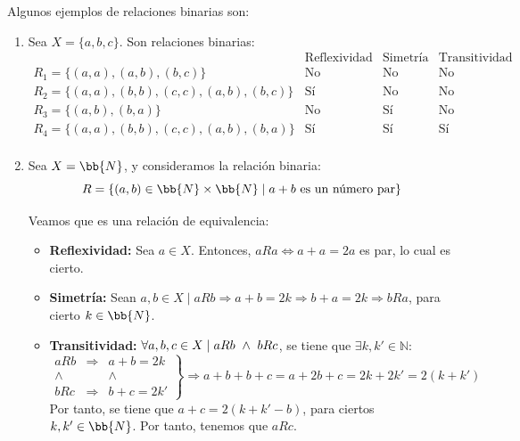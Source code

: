 \begin{ejemplo} Algunos ejemplos de relaciones binarias son:
\begin{enumerate}
    \item Sea $X=\{a,b,c\}$. Son relaciones binarias:
    \begin{equation*}
        \begin{array}{l|ccc}
            & \text{Reflexividad} & \text{Simetría} & \text{Transitividad} \\ \hline
            R_1 = \{(a,a), (a,b), (b,c)\} & \text{No} & \text{No} & \text{No} \\
            R_2 = \{(a,a), (b,b), (c,c), (a,b), (b,c)\} & \text{Sí} & \text{No} & \text{No} \\
            R_3 = \{(a,b), (b,a)\} & \text{No} & \text{Sí} & \text{No} \\
            R_4 = \{(a,a), (b,b), (c,c), (a,b), (b,a)\} & \text{Sí} & \text{Sí} & \text{Sí} \\
        \end{array}
    \end{equation*}

    \item Sea $X=\bb{N}$, y consideramos la relación binaria:
    \begin{equation*}
        R=\{(a,b)\in \bb{N}\times \bb{N} \mid a+b \text{ es un número par}\}
    \end{equation*}

    Veamos que es una relación de equivalencia:
    \begin{itemize}
        \item \textbf{Reflexividad:}  Sea $a\in X$. Entonces, $aRa \Longleftrightarrow a+a=2a$ es par, lo cual es cierto.
        \item \textbf{Simetría:} Sean $a,b \in X \mid aRb\Longrightarrow a+b=2k \Longrightarrow b+a=2k \Longrightarrow bRa$, para cierto $k\in \bb{N}$.
        \item \textbf{Transitividad:} $\forall a,b,c \in X \mid aRb \ \land \  bRc$, se tiene que $\exists k,k'\in \mathbb{N}$:
        \begin{equation*}
            \left.\begin{array}{ccc}
                aRb & \Longrightarrow & a+b=2k \\
                \land&&\land\\
                bRc & \Longrightarrow & b+c=2k'
            \end{array} \right\}
            \Longrightarrow a+b+b+c = a+2b+c = 2k + 2k' = 2(k+k')
        \end{equation*}
        Por tanto, se tiene que $a+c=2(k+k'-b)$, para ciertos $k,k'\in \bb{N}$. Por tanto, tenemos que $aRc$.
    \end{itemize}


\end{enumerate}
\end{ejemplo}
